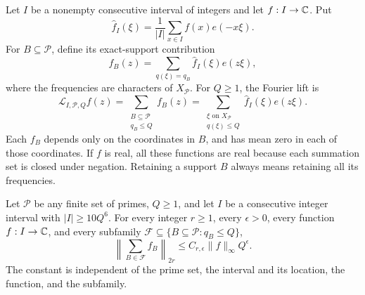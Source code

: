 Let \(I\) be a nonempty consecutive interval of integers and let
\(f:I\to\mathbb C\).  Put
\[
 \widehat f_I(\xi)=\frac1{|I|}\sum_{x\in I}f(x)e(-x\xi).
\]
For \(B\subseteq\mathcal P\), define its exact-support contribution
\[
 f_B(z)=\sum_{q(\xi)=q_B}\widehat f_I(\xi)e(z\xi),
\]
where the frequencies are characters of \(X_{\mathcal P}\).  For
\(Q\ge1\), the Fourier lift is
\[
 \mathcal L_{I,\mathcal P,Q}f(z)
 =\sum_{\substack{B\subseteq\mathcal P\\q_B\le Q}}f_B(z)
 =\sum_{\substack{\xi\text{ on }X_{\mathcal P}\\q(\xi)\le Q}}
                   \widehat f_I(\xi)e(z\xi).
\]
Each \(f_B\) depends only on the coordinates in \(B\), and has mean
zero in each of those coordinates.  If \(f\) is real, all these
functions are real because each summation set is closed under negation.
Retaining a support \(B\) always means retaining all its frequencies.

\begin{proposition}
\label{lift:moments}
Let \(\mathcal P\) be any finite set of primes, \(Q\ge1\), and let
\(I\) be a consecutive integer interval with \(|I|\ge10Q^6\).
For every integer \(r\ge1\), every \(\epsilon>0\), every function
\(f:I\to\mathbb C\), and every subfamily
\(\mathcal F\subseteq\{B\subseteq\mathcal P:q_B\le Q\}\),
\begin{equation}
 \left\|\sum_{B\in\mathcal F}f_B\right\|_{2r}
 \le C_{r,\epsilon}\|f\|_\infty Q^\epsilon.
 \label{eq:12}
\end{equation}
The constant is independent of the prime set, the interval and its
location, the function, and the subfamily.
\end{proposition}

